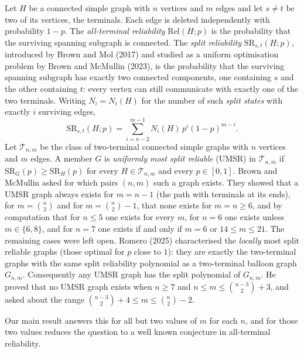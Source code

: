 \documentclass[
  11pt,
]{article}
\newcounter{none} %
\theoremstyle{definition}
\theoremstyle{remark}
\begin{document}
Let \(H\) be a connected simple graph with \(n\) vertices and \(m\)
edges and let \(s\ne t\) be two of its vertices, the terminals. Each
edge is deleted independently with probability \(1-p\). The
\emph{all-terminal reliability} \(\mathrm{Rel}(H;p)\) is the probability
that the surviving spanning subgraph is connected. The \emph{split
reliability} \(\mathrm{SR}_{s,t}(H;p)\), introduced by Brown and Mol
(2017) and studied as a uniform optimisation problem by Brown and
McMullin (2023), is the probability that the surviving spanning subgraph
has exactly two connected components, one containing \(s\) and the other
containing \(t\): every vertex can still communicate with exactly one of
the two terminals. Writing \(N_i=N_i(H)\) for the number of such
\emph{split states} with exactly \(i\) surviving edges,
\[\mathrm{SR}_{s,t}(H;p)=\sum_{i=n-2}^{m-1}N_i(H)\,p^i(1-p)^{m-i}.\] Let
\(\mathcal T_{n,m}\) be the class of two-terminal connected simple
graphs with \(n\) vertices and \(m\) edges. A member \(G\) is
\emph{uniformly most split reliable} (UMSR) in \(\mathcal T_{n,m}\) if
\(\mathrm{SR}_G(p)\ge\mathrm{SR}_H(p)\) for every
\(H\in\mathcal T_{n,m}\) and every \(p\in[0,1]\). Brown and McMullin
asked for which pairs \((n,m)\) such a graph exists. They showed that a
UMSR graph always exists for \(m=n-1\) (the path with terminals at its
ends), for \(m=\binom n2\) and for \(m=\binom n2-1\), that none exists
for \(m=n\ge 6\), and by computation that for \(n\le 5\) one exists for
every \(m\), for \(n=6\) one exists unless \(m\in\{6,8\}\), and for
\(n=7\) one exists if and only if \(m=6\) or \(14\le m\le 21\). The
remaining cases were left open. Romero (2025) characterised the
\emph{locally} most split reliable graphs (those optimal for \(p\) close
to \(1\)): they are exactly the two-terminal graphs with the same split
reliability polynomial as a two-terminal balloon graph \(G_{n,m}\).
Consequently any UMSR graph has the split polynomial of \(G_{n,m}\). He
proved that no UMSR graph exists when \(n\ge 7\) and
\(n\le m\le\binom{n-3}{2}+3\), and asked about the range
\(\binom{n-3}2+4\le m\le\binom n2-2\).

Our main result answers this for all but two values of \(m\) for each
\(n\), and for those two values reduces the question to a well known
conjecture in all-terminal reliability.
\end{document}
